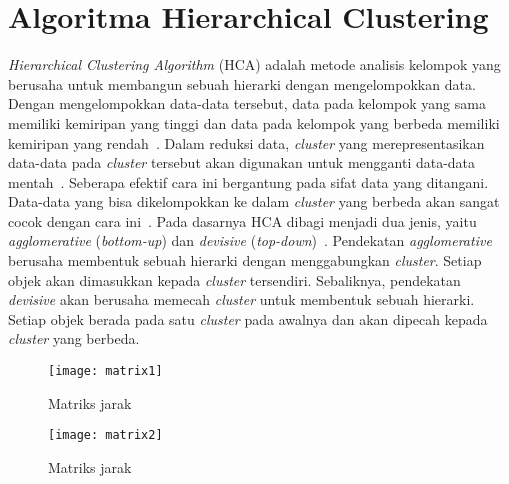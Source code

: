 \section{Algoritma Hierarchical Clustering}

\textit{Hierarchical Clustering Algorithm} (HCA) adalah metode analisis kelompok yang berusaha untuk membangun sebuah hierarki dengan mengelompokkan data. Dengan mengelompokkan data-data tersebut, data pada kelompok yang sama memiliki kemiripan yang tinggi dan data pada kelompok yang berbeda memiliki kemiripan yang rendah~\cite{veronica:02:bdhca}. Dalam reduksi data, \textit{cluster} yang merepresentasikan data-data pada \textit{cluster} tersebut akan digunakan untuk mengganti data-data mentah~\cite{veronica:02:bdhca}. Seberapa efektif cara ini bergantung pada sifat data yang ditangani. Data-data yang bisa dikelompokkan ke dalam \textit{cluster} yang berbeda akan sangat cocok dengan cara ini~\cite{veronica:02:bdhca}. Pada dasarnya HCA dibagi menjadi dua jenis, yaitu \textit{agglomerative} (\textit{bottom-up}) dan \textit{devisive} (\textit{top-down})~\cite{veronica:02:bdhca}. Pendekatan \textit{agglomerative} berusaha membentuk sebuah hierarki dengan menggabungkan \textit{cluster}. Setiap objek akan dimasukkan kepada \textit{cluster} tersendiri. Sebaliknya, pendekatan \textit{devisive} akan berusaha memecah \textit{cluster} untuk membentuk sebuah hierarki. Setiap objek berada pada satu \textit{cluster} pada awalnya dan akan dipecah kepada \textit{cluster} yang berbeda.\\

\begin{figure}[H]
    \centering  
    \texttt{[image: matrix1]}  
    \caption[Matriks jarak]{Matriks jarak} 
    \label{fig:matrix1} 
\end{figure}

\begin{figure}[H]
    \centering  
    \texttt{[image: matrix2]}  
    \caption[Matriks jarak]{Matriks jarak} 
    \label{fig:matrix2} 
\end{figure}

